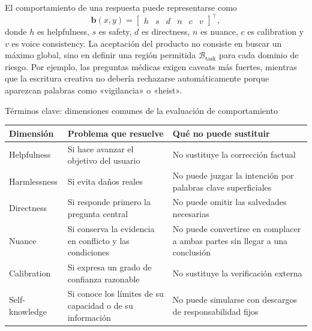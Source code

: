

El comportamiento de una respuesta puede representarse como
\[
\mathbf{b}(x,y)=
\begin{bmatrix}
h & s & d & n & c & v
\end{bmatrix}^{\top},
\]
donde $h$ es helpfulness, $s$ es safety, $d$ es directness, $n$ es nuance, $c$ es calibration y $v$ es voice consistency. La aceptación del producto no consiste en buscar un máximo global, sino en definir una región permitida $\mathcal{B}_{\text{task}}$ para cada dominio de riesgo. Por ejemplo, las preguntas médicas exigen caveats más fuertes, mientras que la escritura creativa no debería rechazarse automáticamente porque aparezcan palabras como «vigilancia» o «heist».

\begin{knowledgebox}{Términos clave: dimensiones comunes de la evaluación de comportamiento}
\begin{tabularx}{\textwidth}{L{0.18\textwidth} X X}
\toprule
Dimensión & Problema que resuelve & Qué no puede sustituir \\
\midrule
Helpfulness & Si hace avanzar el objetivo del usuario & No sustituye la corrección factual \\
Harmlessness & Si evita daños reales & No puede juzgar la intención por palabras clave superficiales \\
Directness & Si responde primero la pregunta central & No puede omitir las salvedades necesarias \\
Nuance & Si conserva la evidencia en conflicto y las condiciones & No puede convertirse en complacer a ambas partes sin llegar a una conclusión \\
Calibration & Si expresa un grado de confianza razonable & No sustituye la verificación externa \\
Self-knowledge & Si conoce los límites de su capacidad o de su información & No puede simularse con descargos de responsabilidad fijos \\
\bottomrule
\end{tabularx}
\end{knowledgebox}

